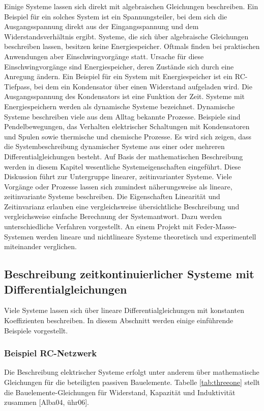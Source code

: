 \noindent Einige Systeme lassen sich direkt mit algebraischen Gleichungen beschreiben. Ein Beispiel für ein solches System ist ein Spannungsteiler, bei dem sich die Ausgangsspannung direkt aus der Eingangsspannung
und dem Widerstandsverhältnis ergibt. Systeme, die sich über algebraische Gleichungen beschreiben lassen, besitzen keine Energiespeicher. Oftmals finden bei praktischen Anwendungen aber Einschwingvorgänge statt. Ursache für diese Einschwingvorgänge sind Energiespeicher, deren
Zustände sich durch eine Anregung ändern. Ein Beispiel für ein System mit Energiespeicher ist ein
RC-Tiefpass, bei dem ein Kondensator über einen Widerstand aufgeladen wird. Die Ausgangsspannung
des Kondensators ist eine Funktion der Zeit. Systeme mit Energiespeichern werden als dynamische Systeme bezeichnet. Dynamische Systeme beschreiben viele aus dem Alltag bekannte Prozesse. Beispiele sind Pendelbewegungen, das Verhalten elektrischer Schaltungen mit Kondensatoren und Spulen sowie thermische und chemische Prozesse. Es wird sich zeigen, dass die Systembeschreibung dynamischer Systeme aus einer oder mehreren Differentialgleichungen besteht.\newline
Auf Basis der mathematischen Beschreibung werden in diesem Kapitel wesentliche Systemeigenschaften
eingeführt. Diese Diskussion führt zur Untergruppe linearer, zeitinvarianter Systeme. Viele Vorgänge oder Prozesse lassen sich zumindest näherungsweise als lineare, zeitinvariante Systeme beschreiben. Die Eigenschaften Linearität und Zeitinvarianz erlauben eine vergleichsweise übersichtliche Beschreibung und vergleichsweise einfache Berechnung der Systemantwort. Dazu werden unterschiedliche
Verfahren vorgestellt.\newline
An einem Projekt mit Feder-Masse-Systemen werden lineare und nichtlineare Systeme theoretisch und experimentell miteinander verglichen.

\subsection{Beschreibung zeitkontinuierlicher Systeme mit Differentialgleichungen}\label{threeone}

Viele Systeme lassen sich über lineare Differentialgleichungen mit konstanten Koeffizienten beschreiben. In diesem Abschnitt werden einige einführende Beispiele vorgestellt.

\subsubsection{Beispiel RC-Netzwerk}
Die Beschreibung elektrischer Systeme erfolgt unter anderem über mathematische Gleichungen für die
beteiligten passiven Bauelemente. Tabelle \ref{tab:threeone} stellt die Bauelemente-Gleichungen für Widerstand, Kapazität und Induktivität zusammen [Alba04, ühr06].


